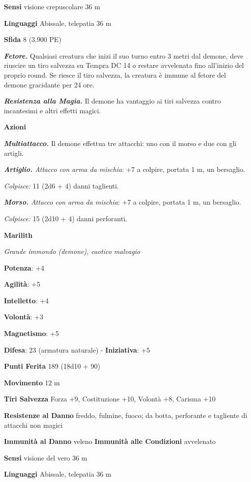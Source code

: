 \begin{multicols}{2}
\textbf{Sensi} visione crepuscolare 36 m

\textbf{Linguaggi} Abissale, telepatia 36 m 

\textbf{Sfida} 8 (3.900 PE)\smallskip

\emph{\textbf{Fetore.}} Qualsiasi creatura che inizi il suo turno entro
3 metri dal demone, deve riuscire un tiro salvezza su Tempra DC 14
o restare avvelenata fino all'inizio del proprio round. Se riesce il
tiro salvezza, la creatura è immune al fetore del demone gracidante per
24 ore.

\emph{\textbf{Resistenza alla Magia.}} Il demone ha vantaggio ai tiri
salvezza contro incantesimi e altri effetti magici.

\smallskip\textbf{Azioni}

\emph{\textbf{Multiattacco.}} Il demone effettua tre attacchi: uno con
il morso e due con gli artigli.

\emph{\textbf{Artiglio.} Attacco con arma da mischia}: +7 a colpire,
portata 1 m, un bersaglio.

\emph{Colpisce:} 11 (2d6 + 4) danni taglienti.

\emph{\textbf{Morso.} Attacco con arma da mischia}: +7 a colpire,
portata 1 m, un bersaglio.

\emph{Colpisce:} 15 (2d10 + 4) danni perforanti.

\textbf{Marilith}

\emph{Grande immondo (demone), caotico malvagio}

\textbf{Potenza}: +4

\textbf{Agilità}: +5

\textbf{Intelletto}: +4

\textbf{Volontà}: +3

\textbf{Magnetismo}: +5

\textbf{Difesa}: 23 (armatura naturale) - \textbf{Iniziativa}: +5

\textbf{Punti Ferita} 189 (18d10 + 90)

\textbf{Movimento} 12 m

\textbf{Tiri Salvezza} Forza +9, Costituzione +10, Volontà +8, Carisma
+10

\textbf{Resistenze al Danno} freddo, fulmine, fuoco; da botta,
perforante e tagliente di attacchi non magici

\textbf{Immunità al Danno} veleno \textbf{Immunità alle Condizioni}
avvelenato

\textbf{Sensi} visione del vero 36 m

\textbf{Linguaggi} Abissale, telepatia 36 m


\end{multicols}
